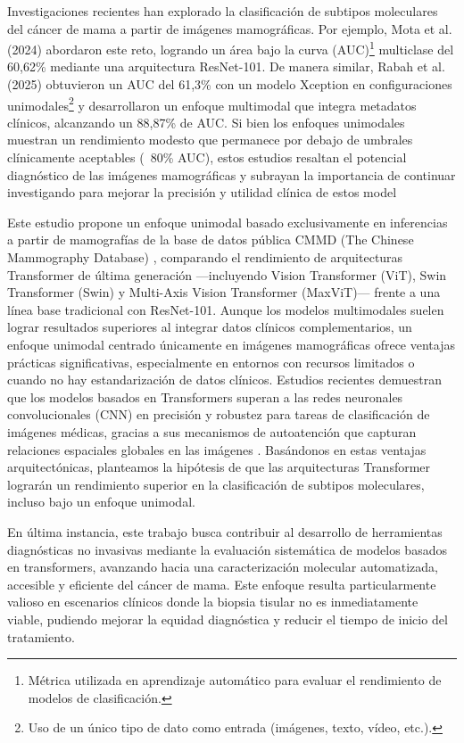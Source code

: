 \documentclass[a4paper,10pt]{book}
\begin{document}
Investigaciones recientes han explorado la clasificación de subtipos moleculares del cáncer de mama a partir de imágenes mamográficas. Por ejemplo, Mota et al. (2024) \cite{mota_breast_2024} abordaron este reto, logrando un área bajo la curva (AUC)\footnote{Métrica utilizada en aprendizaje automático para evaluar el rendimiento de modelos de clasificación.} multiclase del 60,62\% mediante una arquitectura ResNet-101. De manera similar, Rabah et al. (2025) \cite{ben_rabah_multimodal_2025} obtuvieron un AUC del 61,3\% con un modelo Xception en configuraciones unimodales\footnote{Uso de un único tipo de dato como entrada (imágenes, texto, vídeo, etc.).} y desarrollaron un enfoque multimodal que integra metadatos clínicos, alcanzando un 88,87\% de AUC. Si bien los enfoques unimodales muestran un rendimiento modesto que permanece por debajo de umbrales clínicamente aceptables (~80\% AUC), estos estudios resaltan el potencial diagnóstico de las imágenes mamográficas y subrayan la importancia de continuar investigando para mejorar la precisión y utilidad clínica de estos model

Este estudio propone un enfoque unimodal basado exclusivamente en inferencias a partir de mamografías de la base de datos pública CMMD (The Chinese Mammography Database) \cite{cai_online_2023}, comparando el rendimiento de arquitecturas Transformer de última generación —incluyendo Vision Transformer (ViT), Swin Transformer (Swin) y Multi-Axis Vision Transformer (MaxViT)— frente a una línea base tradicional con ResNet-101. Aunque los modelos multimodales suelen lograr resultados superiores al integrar datos clínicos complementarios, un enfoque unimodal centrado únicamente en imágenes mamográficas ofrece ventajas prácticas significativas, especialmente en entornos con recursos limitados o cuando no hay estandarización de datos clínicos. Estudios recientes demuestran que los modelos basados en Transformers superan a las redes neuronales convolucionales (CNN) en precisión y robustez para tareas de clasificación de imágenes médicas, gracias a sus mecanismos de autoatención que capturan relaciones espaciales globales en las imágenes \cite{mauricio_comparing_2023}. Basándonos en estas ventajas arquitectónicas, planteamos la hipótesis de que las arquitecturas Transformer lograrán un rendimiento superior en la clasificación de subtipos moleculares, incluso bajo un enfoque unimodal.

En última instancia, este trabajo busca contribuir al desarrollo de herramientas diagnósticas no invasivas mediante la evaluación sistemática de modelos basados en transformers, avanzando hacia una caracterización molecular automatizada, accesible y eficiente del cáncer de mama. Este enfoque resulta particularmente valioso en escenarios clínicos donde la biopsia tisular no es inmediatamente viable, pudiendo mejorar la equidad diagnóstica y reducir el tiempo de inicio del tratamiento.
\end{document}
